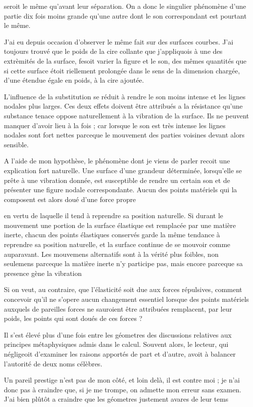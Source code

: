 \documentclass[11pt,a4paper]{article}
\begin{document}
seroit le même qu'avant leur séparation. On a donc le singulier phénomène
d'une partie dix fois moins grande qu'une autre dont le son correspondant est
pourtant le même.

J'ai eu depuis occasion d'observer le même fait sur des surfaces courbes. J'ai
toujours trouvé que le poids de la cire collante que j'appliquois à une des
extrèmités de la surface, fesoit varier la figure et le son, des mêmes
quantités que si cette surface étoit riellement prolongée dans le sens de la
dimension chargée, d'une étendue égale en poids, à la cire ajoutée.

L'influence de la substitution se réduit à rendre le son moins intense et les
lignes nodales plus larges. Ces deux effets doivent être attribués a la
résistance qu'une substance tenace oppose naturellement à la vibration de la
surface. Ils ne peuvent manquer d'avoir lieu à la fois ; car lorsque le son est
très intense les lignes nodales sont fort nettes parceque le mouvement des
parties voisines devant alors sensible.

A l'aide de mon hypothèse, le phénomène dont je viens de parler recoit une
explication fort naturelle. Une surface d'une grandeur déterminée, lorsqu'elle
se prête à une vibration donnée, est susceptible de rendre un certain son et
de présenter une figure nodale correspondante. Aucun des points matériels qui
la composent est alors doué d'une force propre

en vertu de laquelle il tend à reprendre sa position naturelle. Si durant le
mouvement une portion de la surface élastique est remplacée par une matière
inerte, chacun des points élastiques conservés garde la même tendance à
reprendre sa position naturelle, et la surface continue de se mouvoir comme
auparavant. Les mouvemens alternatifs sont à la vérité plus foibles, non
seulemens parceque la matière inerte n'y participe pas, mais encore parceque
sa presence gène la vibration

Si on veut, au contraire, que l'élasticité soit due aux forces répulsives,
comment concevoir qu'il ne s'opere aucun changement essentiel lorsque des
points matériels auxquels de pareilles forces ne sauroient être attribuées
remplacent, par leur poids, les points qui sont doués de ces forces ?

Il s'est élevé plus d'une fois entre les géometres des discussions relatives
aux principes métaphysiques admis dans le calcul. Souvent alors, le lecteur,
qui négligeoit d'examiner les raisons apportés de part et d'autre, avoit à
balancer l'autorité de deux noms célèbres.

Un pareil prestige n'est pas de mon côté, et loin delà, il est contre moi ; je
n'ai donc pas à craindre que, si je me trompe, on admette mon erreur sans
examen. J'ai bien plûtôt a craindre que les géometres justement avares de leur
tems

\end{document}
